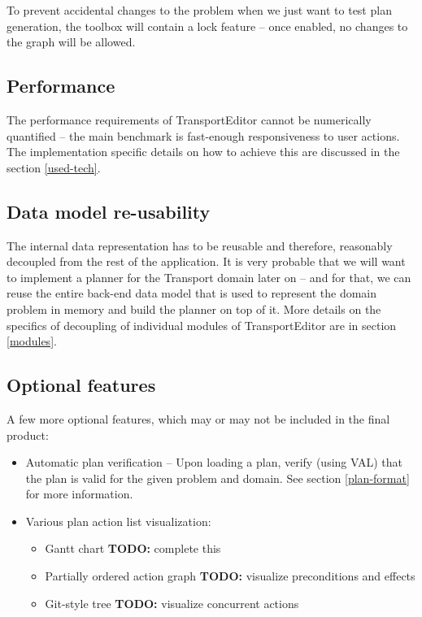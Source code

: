 \documentclass[10pt,a4paper,oneside]{article}
\newcommand{\TODO}[1]{{\textbf{TODO:} #1}} %
\newcommand{\pname}{TransportEditor} %
\begin{document}
To prevent accidental changes to the problem when we just want to test plan generation,
the toolbox will contain a lock feature -- once enabled, no changes to the graph will be allowed.

\subsection{Performance}

The performance requirements of \pname{} cannot be numerically quantified -- the main benchmark is fast-enough
responsiveness to user actions. The implementation specific details on how to achieve this are discussed in the section \ref{used-tech}.

\subsection{Data model re-usability}

The internal data representation has to be reusable and therefore, reasonably decoupled from the rest of the application.
It is very probable that we will want to implement a planner for the Transport domain later on
-- and for that, we can reuse the entire back-end data model that is used to represent the domain problem in memory
and build the planner on top of it.
More details on the specifics of decoupling of individual modules of \pname{} are in section \ref{modules}.

\subsection{Optional features}

A few more optional features, which may or may not be included in the final product:

\begin{itemize}
\item Automatic plan verification -- Upon loading a plan, verify (using VAL) that the plan is valid for the given problem and domain. See section \ref{plan-format} for more information.
\item Various plan action list visualization:
\begin{itemize}
\item Gantt chart \TODO complete this
\item Partially ordered action graph \TODO visualize preconditions and effects
\item Git-style tree \TODO visualize concurrent actions
\end{itemize}
\end{itemize}
\end{document}
